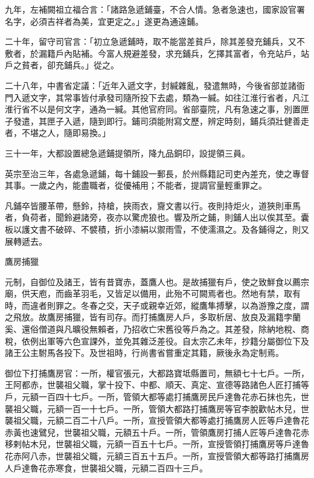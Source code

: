 \begin{pinyinscope}
 九年，左補闕祖立福合言：「諸路急遞鋪臺，不合人情。急者急速也，國家設官署名字，必須吉祥者為美，宜更定之。」遂更為通遠鋪。



 二十年，留守司官言：「初立急遞鋪時，取不能當差貧戶，除其差發充鋪兵，又不敷者，於漏籍戶內貼補。今富人規避差發，求充鋪兵，乞擇其富者，令充站戶，站戶之貧者，卻充鋪兵。」從之。



 二十八年，中書省定議：「近年入遞文字，封緘雜亂，發遣無時，今後省部並諸衙門入遞文字，其常事皆付承發司隨所投下去處，類為一緘。如往江淮行省者，凡江淮行省不以是何文字，通為一緘。其他官府同。省部臺院，凡有急速之事，別置匣子發遣，其匣子入遞，隨到即行。鋪司須能附寫文歷，辨定時刻，鋪兵須壯健善走者，不堪之人，隨即易換。」



 三十一年，大都設置總急遞鋪提領所，降九品銅印，設提領三員。



 英宗至治三年，各處急遞鋪，每十鋪設一郵長，於州縣籍記司吏內差充，使之專督其事。一歲之內，能盡職者，從優補用；不能者，提調官量輕重罪之。



 凡鋪卒皆腰革帶，懸鈴，持槍，挾雨衣，齎文書以行。夜則持炬火，道狹則車馬者，負荷者，聞鈴避諸旁，夜亦以驚虎狼也。響及所之鋪，則鋪人出以俟其至。囊板以護文書不破碎、不襞積，折小漆絹以禦雨雪，不使濡濕之。及各鋪得之，則又展轉遞去。



 鷹房捕獵



 元制，自御位及諸王，皆有昔寶赤，蓋鷹人也。是故捕獵有戶，使之致鮮食以薦宗廟，供天庖，而齒革羽毛，又皆足以備用，此殆不可闕焉者也。然地有禁，取有時，而違者則罪之。冬春之交，天子或親幸近郊，縱鷹隼搏擊，以為游豫之度，謂之飛放。故鷹房捕獵，皆有司存。而打捕鷹房人戶，多取析居、放良及漏籍孛蘭奚、還俗僧道與凡曠役無賴者，乃招收亡宋舊役等戶為之。其差發，除納地稅、商稅，依例出軍等六色宣課外，並免其雜泛差役。自太宗乙未年，抄籍分屬御位下及諸王公主駙馬各投下。及世祖時，行尚書省嘗重定其籍，厥後永為定制焉。



 御位下打捕鷹房官：一所，權官張元，大都路寶坻縣置司，無額七十七戶。一所，王阿都赤，世襲祖父職，掌十投下、中都、順天、真定、宣德等路諸色人匠打捕等戶，元額一百四十七戶。一所，管領大都等處打捕鷹房民戶達魯花赤石抹也先，世襲祖父職，元額一百一十七戶。一所，管領大都路打捕鷹房等官李脫歡帖木兒，世襲祖父職，元額二百二十八戶。一所，宣授管領大都等處打捕鷹房人匠等戶達魯花赤黃也速鷿兒，世襲祖父職，元額五十戶。一所，管領鷹房打捕人匠等戶達魯花赤移剌帖木兒，世襲祖父職，元額一百五十七戶。一所，宣授管領打捕鷹房等戶達魯花赤阿八赤，世襲祖父職，元額三百五十五戶。一所，宣授管領大都等路打捕鷹房人戶達魯花赤寒食，世襲祖父職，元額二百四十三戶。




\end{pinyinscope}

